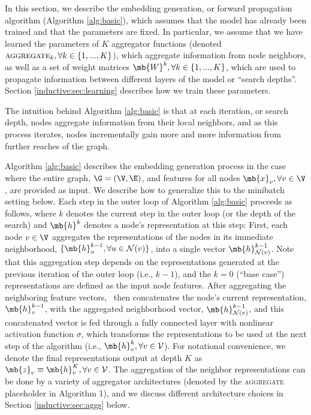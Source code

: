 In this section, we describe the embedding generation, or forward propagation algorithm (Algorithm \ref{alg:basic}), which assumes that the model has already been trained and that the parameters are fixed. 
In particular, we assume that we have learned the parameters of $K$ aggregator functions (denoted $\textsc{aggregate}_k, \forall k \in \{1,...,K\}$), which aggregate information from node neighbors, as well as a set of weight matrices $\mb{W}^{k}, \forall k \in \{1,...,K\}$, which are used to propagate information between different layers of the model or ``search depths''. 
Section \ref{inductive:sec:learning} describes how we train these parameters. 

The intuition behind Algorithm \ref{alg:basic} is that at each iteration, or search depth, nodes aggregate information from their local neighbors, and as this process iterates, nodes incrementally gain more and more information from further reaches of the graph.

Algorithm \ref{alg:basic} describes the embedding generation process in the case where the entire graph, $\G=(\V, \E)$,  and features  for all nodes $\mb{x}_v, \forall v \in \V$, are provided as input.
We describe how to generalize this to the minibatch setting below. 
Each step in the outer loop of Algorithm \ref{alg:basic} proceeds as follows, where $k$ denotes the current step in the outer loop (or the depth of the search) and $\mb{h}^{k}$ denotes a node's representation at this step: First, each node $v\in\V$ aggregates the representations of the nodes in its immediate neighborhood, $\{\mb{h}^{k-1}_u, \forall u \in \mathcal{N}(v)\}$, into a single vector $\mb{h}^{k-1}_{\mathcal{N}(v)}$. 
Note that this aggregation step depends on the representations generated at the previous iteration of the outer loop (i.e., $k-1$),  and the $k=0$ (``base case'') representations are defined as the input node features. 
After aggregating the neighboring feature vectors, \name\ then concatenates the node's current representation, $\mb{h}_v^{k-1}$, with the aggregated neighborhood vector, $\mb{h}^{k-1}_{\mathcal{N}(v)}$, and this concatenated vector is fed through a fully connected layer with nonlinear activation function $\sigma$, which transforms the representations to be used at the next step of the algorithm (i.e.,  $ \mb{h}_v^{k}, \forall v \in \mathcal{V}$). 
For notational convenience, we denote the final representations output at depth $K$ as $\mb{z}_v \equiv \mb{h}^K_v , \forall v \in \mathcal{V}$.
The aggregation of the neighbor representations can be done by a variety of aggregator architectures (denoted by the \textsc{aggregate} placeholder in Algorithm 1), and we discuss different architecture choices in Section \ref{inductive:sec:aggs} below.


